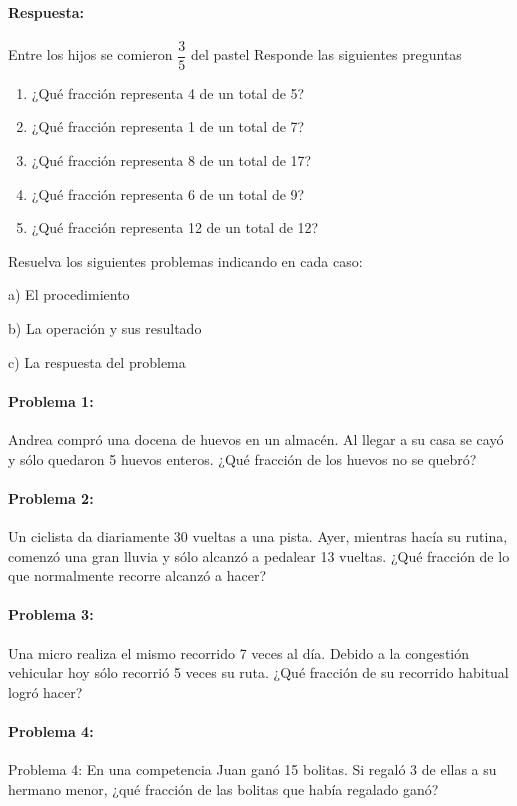 \documentclass[10pt,twoside]{article}
\begin{document}
\paragraph*{Respuesta:}
Entre los hijos se comieron $\dfrac{3}{5}$ del pastel
Responde las siguientes preguntas
\begin{enumerate}
\item ¿Qu\'{e} fracci\'{o}n representa 4 de un total de 5?
\item ¿Qu\'{e} fracci\'{o}n representa 1 de un total de 7?
\item ¿Qu\'{e} fracci\'{o}n representa 8 de un total de 17?
\item ¿Qu\'{e} fracci\'{o}n representa 6 de un total de 9?
\item ¿Qu\'{e} fracci\'{o}n representa 12 de un total de 12?
\end{enumerate}
Resuelva los siguientes problemas indicando en cada caso:
\begin{enumerate}
\begin{multicols}{2}
\item[a)] El procedimiento
\item[b)] La operación y sus resultado
\item[c)] La respuesta del problema\end{multicols}
\end{enumerate}
\paragraph*{Problema 1:} Andrea compró una docena de huevos en un almacén. Al llegar a su casa se cayó y sólo quedaron 5 huevos enteros. ¿Qué fracción de los huevos no se quebró?
\paragraph*{Problema 2:} Un ciclista da diariamente 30 vueltas a una pista. Ayer, mientras hacía su rutina, comenzó una gran lluvia y sólo alcanzó a pedalear 13 vueltas. ¿Qué fracción de lo que normalmente recorre alcanzó a hacer?
\paragraph*{Problema 3:} 
Una micro realiza el mismo recorrido 7 veces al día. Debido a la congestión vehicular hoy sólo recorrió 5 veces su ruta. ¿Qué fracción de su recorrido habitual logró hacer?
\paragraph*{Problema 4:} Problema 4:
En una competencia Juan ganó 15 bolitas. Si regaló 3 de ellas a su hermano menor, ¿qué fracción de las bolitas que había regalado ganó? 
\end{document}
